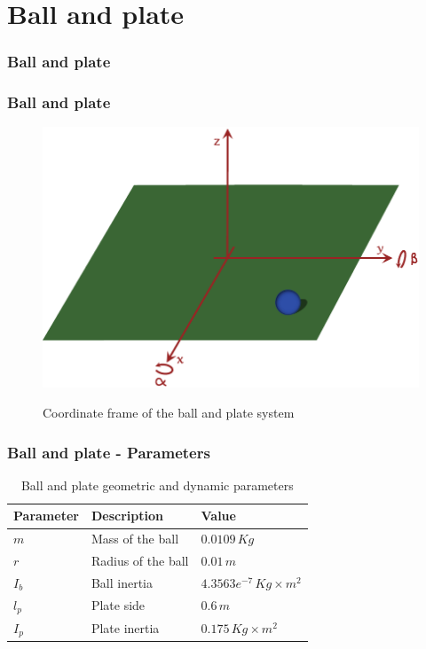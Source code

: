 %
\section{Ball and plate}
\begin{frame}
	\frametitle{Ball and plate}
\end{frame}
%
\begin{frame}
\frametitle{Ball and plate}
%
\begin{figure}
		{\includegraphics[width=.8\linewidth]{img/ballplate.pdf}}
		\caption{Coordinate frame of the ball and plate system}
		\label{fig:BallPlate}
\end{figure}
\end{frame}
%
\begin{frame}
\frametitle{Ball and plate - Parameters}
\begin{table}
\begin{center}
\begin{tabu} to \textwidth { | X[c] | X[c] | X[c] | }
	\hline
	\textbf{Parameter} & \textbf{Description} & \textbf{Value} \\
	\hline
	$m$ & Mass of the ball & $0.0109 \, Kg$ \\
	$r$ & Radius of the ball & $0.01 \, m$ \\
	$I_b$ & Ball inertia & $4.3563e^{-7} \, Kg\times m^2$ \\
	$l_p$ & Plate side & $0.6 \, m$ \\
	$I_p$ & Plate inertia & $0.175 \, Kg\times m^2$ \\
	\hline
\end{tabu}
\caption{Ball and plate geometric and dynamic parameters}
\label{tab:BallPlate_param}
\end{center}
\end{table}
\end{frame}
%
